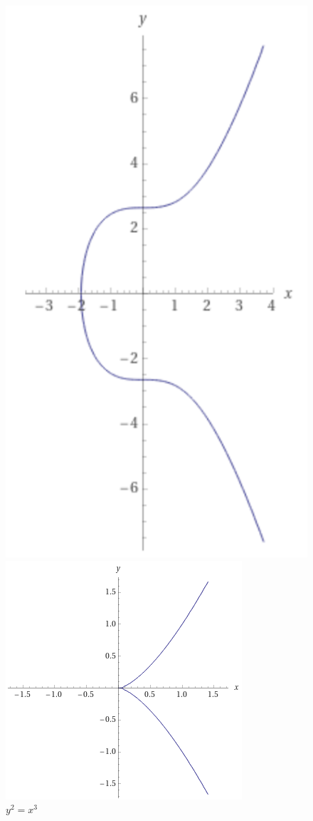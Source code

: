 \begin{figure}
\centering
\begin{minipage}{.5\textwidth}
  \centering
  \includegraphics[width=.4\linewidth]{Pictures/bitcoinec.png}
  \caption{\(y^2 = x^3 +7\)}
  \label{fig:test1}
\end{minipage}%
\begin{minipage}{.5\textwidth}
  \centering
  \includegraphics[width=.7\linewidth]{Pictures/y2x3.png}
  \caption{\(y^2 = x^3\)}
  \label{fig:test2}
\end{minipage}
\end{figure}


